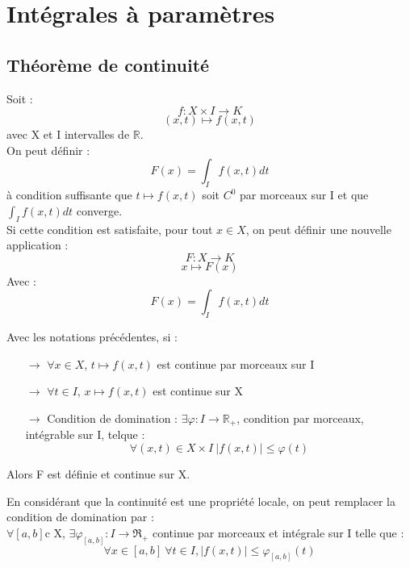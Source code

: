 \chapter{Intégrales à paramètres}
\section{Théorème de continuité}
Soit :
$$f : X\times I \rightarrow K $$
$$(x,t) \mapsto f(x,t)$$
avec X et I intervalles de $\mathbb{R}$.\\
On peut définir :
$$F(x) = \int_I f(x,t) dt$$
à condition suffisante que $t \mapsto f(x,t)$ soit $C^0$ par morceaux sur I et que $\int_I f(x,t)dt$ converge.\\
Si cette condition est satisfaite, pour tout $x \in X$, on peut définir une nouvelle application :
$$F : X \rightarrow K$$
$$x \mapsto F(x) $$
Avec : 
$$F(x) = \int_I f(x,t) dt$$
\begin{theo}
Avec les notations précédentes, si : 
\begin{itemize}
 \item[$\rightarrow$] $\forall x \in X$, $t \mapsto f(x,t)$ est continue par morceaux sur I
 \item[$\rightarrow$] $\forall t \in I$, $x \mapsto f(x,t)$ est continue sur X
 \item[$\rightarrow$] Condition de domination : $\exists \varphi : I \rightarrow \mathbb{R}_+$, condition par morceaux, intégrable sur I, telque :
$$\forall (x,t) \in X \times I~ |f(x,t)| \leq \varphi(t)$$
\end{itemize}
Alors F est définie et continue sur X.
\end{theo}
\begin{prop}
En considérant que la continuité est une propriété locale, on peut remplacer la condition de domination par : \\
$\forall [a,b] $c X, $\exists \varphi_{[a,b]} : I \rightarrow \Re_+$ continue par morceaux et intégrale sur I telle que : 
$$\forall x \in [a,b]~ \forall t \in I, |f(x,t)|\leq \varphi_{[a,b]}(t)$$
\end{prop}
